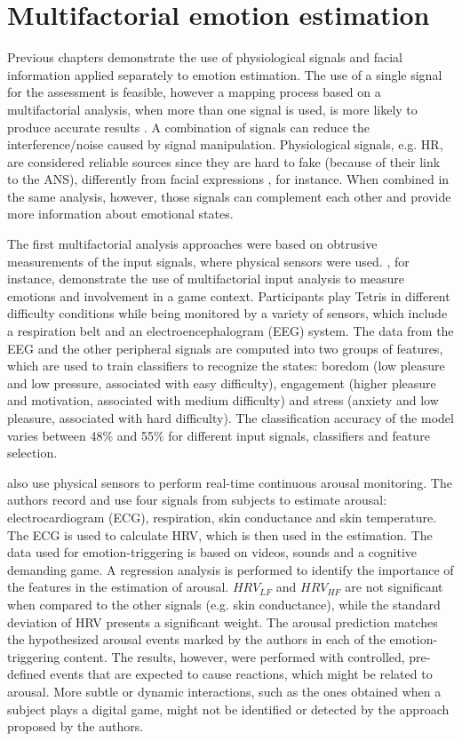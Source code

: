 \chapter{Multifactorial emotion estimation}
\label{ch:literature-multifactorial}

Previous chapters demonstrate the use of physiological signals and facial information applied separately to emotion estimation. The use of a single signal for the assessment is feasible, however a mapping process based on a multifactorial analysis, when more than one signal is used, is more likely to produce accurate results \parencite{kukolja2014comparative}. A combination of signals can reduce the interference/noise caused by signal manipulation. Physiological signals, e.g. HR, are considered reliable sources since they are hard to fake (because of their link to the ANS), differently from facial expressions \parencite{Landowska}, for instance. When combined in the same analysis, however, those signals can complement each other and provide more information about emotional states.

The first multifactorial analysis approaches were based on obtrusive measurements of the input signals, where physical sensors were used. \textcite{Chanel_2011}, for instance, demonstrate the use of multifactorial input analysis to measure emotions and involvement in a game context. Participants play Tetris in different difficulty conditions while being monitored by a variety of sensors, which include a respiration belt and an electroencephalogram (EEG) system. The data from the EEG and the other peripheral signals are computed into two groups of features, which are used to train classifiers to recognize the states: boredom (low pleasure and low pressure, associated with easy difficulty), engagement (higher pleasure and motivation, associated with medium difficulty) and stress (anxiety and low pleasure, associated with hard difficulty). The classification accuracy of the model varies between 48\% and 55\% for different input signals, classifiers and feature selection.

\textcite{grundlehner2009design} also use physical sensors to perform real-time continuous arousal monitoring. The authors record and use four signals from subjects to estimate arousal: electrocardiogram (ECG), respiration, skin conductance and skin temperature. The ECG is used to calculate HRV, which is then used in the estimation. The data used for emotion-triggering is based on videos, sounds and a cognitive demanding game. A regression analysis is performed to identify the importance of the features in the estimation of arousal. $HRV_{LF}$ and $HRV_{HF}$ are not significant when compared to the other signals (e.g. skin conductance), while the standard deviation of HRV presents a significant weight. The arousal prediction matches the hypothesized arousal events marked by the authors in each of the emotion-triggering content. The results, however, were performed with controlled, pre-defined events that are expected to cause reactions, which might be related to arousal. More subtle or dynamic interactions, such as the ones obtained when a subject plays a digital game, might not be identified or detected by the approach proposed by the authors.


